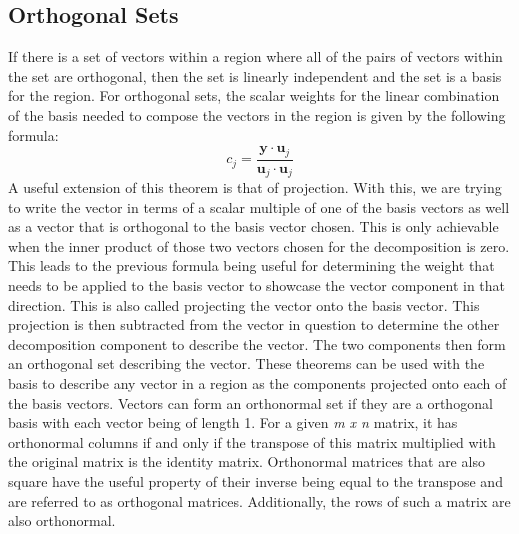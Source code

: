 \documentclass[12pt]{article}
\begin{document}
\subsection{Orthogonal Sets}
If there is a set of vectors within a region where all of the pairs of vectors within the set are orthogonal, then the set is linearly independent and the set is a basis for the region. 
For orthogonal sets, the scalar weights for the linear combination of the basis needed to compose the vectors in the region is given by the following formula:
\newline
$$
c_j=\dfrac{\mathbf{y}\cdot \mathbf{u}_j}{\mathbf{u}_j\cdot \mathbf{u}_j}
$$
\newline
A useful extension of this theorem is that of projection. With this, we are trying to write the vector in terms of a scalar multiple of one of the basis vectors as well as a vector that 
is orthogonal to the basis vector chosen. This is only achievable when the inner product of those two vectors chosen for the decomposition is zero. This leads to the previous formula being 
useful for determining the weight that needs to be applied to the basis vector to showcase the vector component in that direction. This is also called projecting the vector onto the 
basis vector. This projection is then subtracted from the vector in question to determine the other decomposition component to describe the vector. The two components then form an 
orthogonal set describing the vector. These theorems can be used with the basis to describe any vector in a region as the components projected onto each of the basis vectors. Vectors can 
form an orthonormal set if they are a orthogonal basis with each vector being of length 1. For a given \textit{m x n} matrix, it has orthonormal columns if and only if the transpose 
of this matrix multiplied with the original matrix is the identity matrix. Orthonormal matrices that are also square have the useful property of their inverse being equal to the 
transpose and are referred to as orthogonal matrices. Additionally, the rows of such a matrix are also orthonormal. 
\end{document}
